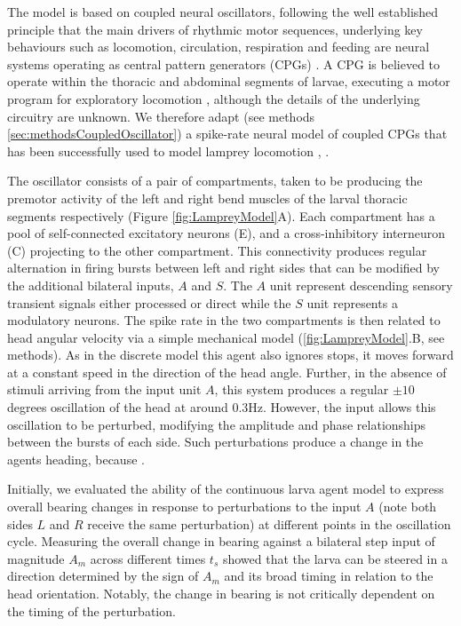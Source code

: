 \documentclass[11pt,a4paper]{article}
\newcommand{\todoBW}[1]{\todo[author=BW,color=orange, size=\tiny,inline]{#1}}
\begin{document}
The model is based on coupled neural oscillators, following the well established principle that the main drivers of rhythmic  motor sequences, underlying key behaviours such as locomotion, circulation, respiration and feeding are neural systems operating as central pattern generators (CPGs) \citep{delcomyn1980neural}. A CPG is believed to operate  within the thoracic and abdominal segments of larvae, executing a motor program for exploratory locomotion \citep{hughes2007sensory,berni2012autonomous,lemon2015whole}, although the details of the underlying circuitry are unknown. We therefore adapt (see methods \ref{sec:methodsCoupledOscillator}) a spike-rate neural model of coupled CPGs that has been successfully used to model lamprey locomotion \citep{cohen1992modelling,lansner1997realistic}, \cite[see][]{marder1996principles}.


The oscillator consists of a pair of compartments, taken to be producing the premotor activity of the left and right bend muscles of the larval thoracic  segments respectively (Figure \ref{fig:LampreyModel}A). Each compartment has a pool of self-connected excitatory neurons (E), and a cross-inhibitory interneuron (C) projecting to the other compartment. This connectivity produces regular alternation in firing bursts between left and right sides that can be modified by the additional bilateral inputs, $A$ and $S$. The $A$ unit represent descending sensory transient signals either processed or direct while the $S$ unit represents a modulatory neurons.
 The spike rate in the two compartments is then related to head angular velocity via a simple mechanical model (\ref{fig:LampreyModel}.B, see methods). As in the discrete model this agent also ignores stops, it moves forward at a constant speed in the direction of the head angle. Further, in the absence of stimuli arriving from the input unit $A$, this system produces a regular $\pm 10$ degrees oscillation of the head at around 0.3Hz. However, the input allows this oscillation to be perturbed, modifying  the amplitude and phase relationships between the bursts of each side. Such perturbations produce a change in the agents heading, because .

Initially, we evaluated the ability of the continuous larva agent model to express overall bearing changes in response to perturbations to the input $A$ (note both sides $L$ and $R$ receive the same perturbation) at different points in the oscillation cycle. Measuring the overall change in bearing against a bilateral step input of magnitude $A_m$ across different times $t_s$ showed that the larva can be steered in a direction determined by the sign of $A_m$ and its broad timing in relation to the head orientation.
Notably, the change in bearing is not critically dependent on the timing of the perturbation. 
\end{document}
